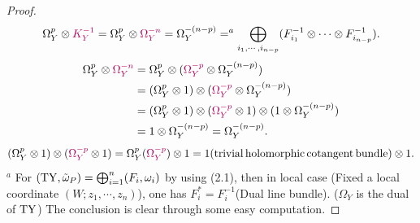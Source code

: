 \documentclass[lang=en,12pt]{beautybook}
\begin{document}
\begin{proof}
  \[ \Omega^p_Y \otimes {\color[HTML]{B4005A}K_Y^{- 1}} = \Omega^p_Y \otimes
    {\color[HTML]{B4005A}\Omega^{- n}_Y} = \Omega_Y^{- (n - p)} =^a
    \bigoplus_{i_1, \cdots, i_{n - p}} (F_{i_1}^{- 1} \otimes \cdots \otimes
    F_{i_{n - p}}^{- 1}) . \]
  \begin{align*}
    \Omega^p_Y \otimes {\color[HTML]{B4005A}\Omega^{- n}_Y} & =  \Omega^p_Y
    \otimes ({\color[HTML]{B4005A}\Omega^{- p}_Y} \otimes \Omega_Y^{- (n -
    p)})                                                                                                                        \\
                                                            & =  (\Omega_Y^p \otimes 1) \otimes ({\color[HTML]{B4005A}\Omega^{-
    p}_Y} \otimes \Omega_Y^{- (n - p)})                                                                                         \\
                                                            & =  (\Omega_Y^p \otimes 1) \otimes ({\color[HTML]{B4005A}\Omega^{-
    p}_Y} \otimes 1) \otimes (1 \otimes \Omega_Y^{- (n - p)})                                                                   \\
                                                            & =  1 \otimes \Omega_Y^{- (n - p)} = \Omega_Y^{- (n - p)} .
  \end{align*}
  \[ (\Omega_Y^p \otimes 1) \otimes ({\color[HTML]{B4005A}\Omega^{- p}_Y}
    \otimes 1) = \Omega_Y^p ({\color[HTML]{B4005A}\Omega_Y^{- p}}) \otimes 1
    = 1 (\tmop{trivial} \tmop{holomorphic} \tmop{cotangent} \tmop{bundle})
    \otimes 1. \]
  $^a$ For $(\operatorname{TY}, \tilde{\omega}_P) = \bigoplus_{i = 1}^n (F_i,
    \omega_i)$ by using (2.1), then in local case (Fixed a local coordinate $(W
    ; z_1, \cdots, z_n)$), one has $F_i^{\ast} = F_i^{- 1}$(Dual line
  bundle)\cite[\S 2.2,p71]{Huybrechts2010Complex}. ($\Omega_Y$ is the dual
  of $\operatorname{TY}$) The conclusion is clear through some easy computation.


\end{proof}
\end{document}
